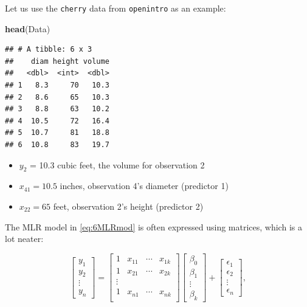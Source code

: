 \documentclass[
]{book}
\newenvironment{Shaded}{\begin{snugshade}}{\end{snugshade}}
\newcommand{\FunctionTok}[1]{\textcolor[rgb]{0.13,0.29,0.53}{\textbf{#1}}}
\newcommand{\NormalTok}[1]{#1}
\providecommand{\tightlist}{%
  \setlength{\itemsep}{0pt}\setlength{\parskip}{0pt}}
\begin{document}
Let us use the \texttt{cherry} data from \texttt{openintro} as an example:

\begin{Shaded}
\begin{Highlighting}[]
\FunctionTok{head}\NormalTok{(Data)}
\end{Highlighting}
\end{Shaded}

\begin{verbatim}
## # A tibble: 6 x 3
##    diam height volume
##   <dbl>  <int>  <dbl>
## 1   8.3     70   10.3
## 2   8.6     65   10.3
## 3   8.8     63   10.2
## 4  10.5     72   16.4
## 5  10.7     81   18.8
## 6  10.8     83   19.7
\end{verbatim}

\begin{itemize}
\tightlist
\item
  \(y_2\) = 10.3 cubic feet, the volume for observation 2
\item
  \(x_{41} = 10.5\) inches, observation 4's diameter (predictor 1)
\item
  \(x_{22} = 65\) feet, observation 2's height (predictor 2)
\end{itemize}

The MLR model in \eqref{eq:6MLRmod} is often expressed using matrices, which is a lot neater:

\[
\left[
\begin{array}{c}
   y_1  \\
   y_2  \\
   \vdots   \\
   y_n
\end{array}
\right] =
\left[
\begin{array}{cccc}
   1 & x_{11} & \cdots & x_{1k}  \\
   1 & x_{21} & \cdots & x_{2k}  \\
   \vdots   \\
   1 & x_{n1} & \cdots & x_{nk}  \\
\end{array}
\right]
\left[
\begin{array}{c}
\beta_0 \\
\beta_1 \\
\vdots \\
\beta_{k}
\end{array}
\right] +
\left[
\begin{array}{c}
   \epsilon_1  \\
   \epsilon_2  \\
   \vdots   \\
   \epsilon_n
\end{array}
\right],
\]
\end{document}
